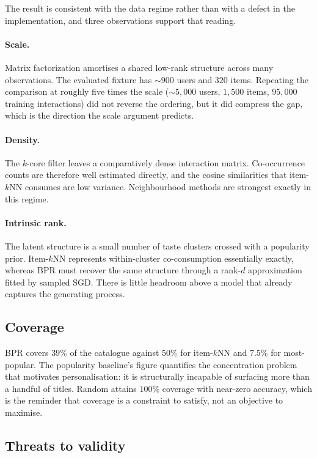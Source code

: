 The result is consistent with the data regime rather than with a defect in
the implementation, and three observations support that reading.

\paragraph{Scale.} Matrix factorization amortises a shared low-rank structure
across many observations. The evaluated fixture has $\sim 900$ users and
$320$ items. Repeating the comparison at roughly five times the scale
($\sim 5{,}000$ users, $1{,}500$ items, $95{,}000$ training interactions) did
not reverse the ordering, but it did compress the gap, which is the direction
the scale argument predicts.

\paragraph{Density.} The $k$-core filter leaves a comparatively dense
interaction matrix. Co-occurrence counts are therefore well estimated
directly, and the cosine similarities that item-$k$NN consumes are low
variance. Neighbourhood methods are strongest exactly in this regime.

\paragraph{Intrinsic rank.} The latent structure is a small number of taste
clusters crossed with a popularity prior. Item-$k$NN represents
within-cluster co-consumption essentially exactly, whereas BPR must recover
the same structure through a rank-$d$ approximation fitted by sampled SGD.
There is little headroom above a model that already captures the generating
process.

\subsection{Coverage}

BPR covers $39\%$ of the catalogue against $50\%$ for item-$k$NN and $7.5\%$
for most-popular. The popularity baseline's figure quantifies the
concentration problem that motivates personalisation: it is structurally
incapable of surfacing more than a handful of titles. Random attains $100\%$
coverage with near-zero accuracy, which is the reminder that coverage is a
constraint to satisfy, not an objective to maximise.

\subsection{Threats to validity}

